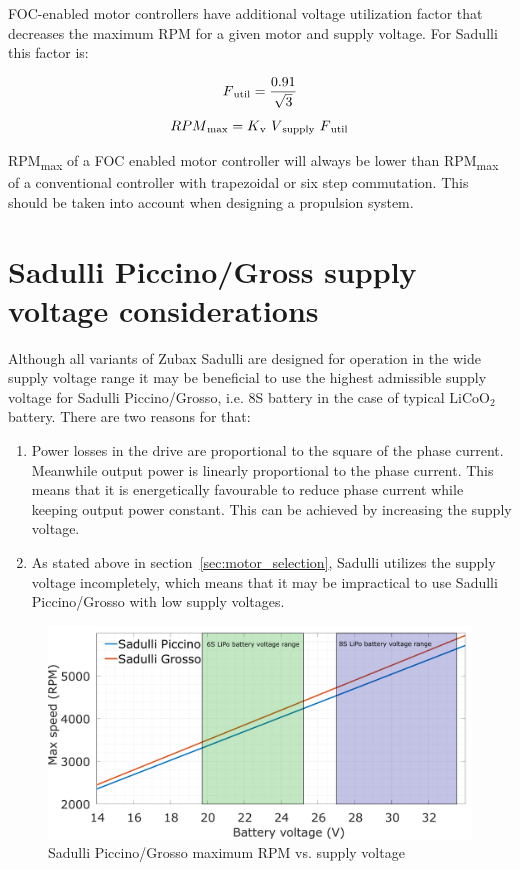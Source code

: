 FOC-enabled motor controllers have additional voltage utilization factor that decreases the maximum RPM
for a given motor and supply voltage. For Sadulli this factor is:

\[F\textsubscript{util} = \frac{0.91}{\sqrt{3}}\]
\[RPM\textsubscript{max} = K\textsubscript{v}\ V\textsubscript{supply}\ F\textsubscript{util}\]

RPM\textsubscript{max} of a FOC enabled motor controller will always be lower than RPM\textsubscript{max} 
of a conventional controller with trapezoidal or six step commutation. This should be taken into account
when designing a propulsion system. 

\newpage

\section {Sadulli Piccino/Gross supply voltage considerations}

Although all variants of Zubax Sadulli are designed for operation in the wide supply voltage range
it may be beneficial to use the highest admissible supply voltage for Sadulli Piccino/Grosso,
i.e. 8S battery in the case of typical $\text{LiCoO}_\text{2}$ battery. There are two reasons for that:

\begin{enumerate}
\item Power losses in the drive are proportional to the square of the phase current.
Meanwhile output power is linearly proportional to the phase current.
This means that it is energetically favourable to reduce phase current while keeping output power constant.
This can be achieved by increasing the supply voltage. 

\item As stated above in section~\ref{sec:motor_selection}, Sadulli utilizes the supply voltage incompletely,
which means that it may be impractical to use Sadulli Piccino/Grosso with low supply voltages.
\end{enumerate}

\begin{figure}[!hbt]
    \centerline{\includegraphics[width=1\textwidth]{figures/thrust_graphs/maxrpm_vs_voltage.pdf}}
    \caption{Sadulli Piccino/Grosso maximum RPM vs. supply voltage}
\end{figure}

